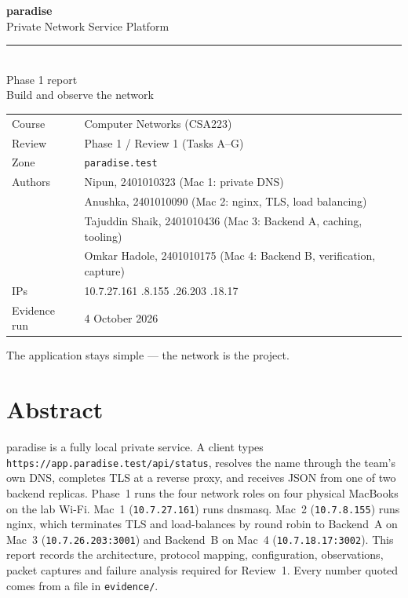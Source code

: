 \documentclass[11pt,a4paper]{article}
\begin{document}
\begin{titlepage}
\pagecolor{lmNavy}
\color{white}
\vspace*{1.6cm}
{\Huge\bfseries paradise}\\[8pt]
{\LARGE Private Network Service Platform}\\[18pt]
{\color{lmTeal}\rule{4.2cm}{2.4pt}}\\[16pt]
{\Large Phase 1 report}\\[6pt]
{\large Build and observe the network}\\[2.4cm]
\begin{tabular}{@{}ll}
  \color{lmTeal} Course & \color{white} Computer Networks (CSA223) \\[4pt]
  \color{lmTeal} Review & \color{white} Phase 1 / Review 1 (Tasks A--G) \\[4pt]
  \color{lmTeal} Zone & \color{white} \texttt{paradise.test} \\[4pt]
  \color{lmTeal} Authors & \color{white} Nipun, 2401010323 (Mac 1: private DNS) \\
                         & \color{white} Anushka, 2401010090 (Mac 2: nginx, TLS, load balancing) \\
                         & \color{white} Tajuddin Shaik, 2401010436 (Mac 3: Backend A, caching, tooling) \\
                         & \color{white} Omkar Hadole, 2401010175 (Mac 4: Backend B, verification, capture) \\[4pt]
  \color{lmTeal} IPs & \color{white} 10.7.27.161 \quad 10.7.8.155 \quad 10.7.26.203 \quad 10.7.18.17 \\[4pt]
  \color{lmTeal} Evidence run & \color{white} 4 October 2026 \\
\end{tabular}
\vfill
{\small The application stays simple --- the network is the project.}
\end{titlepage}
\nopagecolor
\color{black}

\tableofcontents
\newpage

\section{Abstract}
paradise is a fully local private service. A client types
\texttt{https://app.paradise.test/api/status}, resolves the name through the team's own DNS,
completes TLS at a reverse proxy, and receives JSON from one of two backend replicas.
Phase~1 runs the four network roles on four physical MacBooks on the lab Wi-Fi.
Mac~1 (\texttt{10.7.27.161}) runs dnsmasq. Mac~2 (\texttt{10.7.8.155}) runs nginx, which terminates
TLS and load-balances by round robin to Backend~A on Mac~3 (\texttt{10.7.26.203:3001}) and
Backend~B on Mac~4 (\texttt{10.7.18.17:3002}). This report records the architecture,
protocol mapping, configuration, observations, packet captures and failure analysis
required for Review~1. Every number quoted comes from a file in \texttt{evidence/}.
\end{document}
